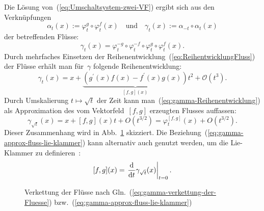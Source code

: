 Die Lösung von~$ $(\ref{eq:Umschaltsystem-zwei-VF}) ergibt sich
aus den Verknüpfungen 
\begin{equation}
\alpha_{t}(x):=\varphi_{t}^{g}\circ\varphi_{t}^{f}(x)\quad\mbox{und}\quad\gamma_{t}(x):=\alpha_{-t}\circ\alpha_{t}(x)\label{eq:alpha-gamma-verkettung}
\end{equation}
der betreffenden Flüsse: 
\begin{equation}
\gamma_{t}(x)=\varphi_{t}^{-g}\circ\varphi_{t}^{-f}\circ\varphi_{t}^{g}\circ\varphi_{t}^{f}(x).\label{eq:gamma-verkettung-der-Fluesse}
\end{equation}
Durch mehrfaches Einsetzen der Reihenentwicklung~(\ref{eq:ReihentwicklungFluss})
der Flüsse erhält man für~$\gamma$ folgende Reihenentwicklung:
\begin{equation}
\gamma_{t}(x)=x+\underbrace{\left(g^{\prime}(x)f(x)-f^{\prime}(x)g(x)\right)}_{{\displaystyle [f,g](x)}}t^{2}+\mathcal{O}(t^{3}).\label{eq:gamma-Reihenentwicklung}
\end{equation}
Durch Umskalierung $t\mapsto\sqrt{t}$ der Zeit kann man~(\ref{eq:gamma-Reihenentwicklung})
als Approximation des vom Vektor\-feld~$[f,g]$ erzeugten Flusses
auffassen: 
\begin{equation}
\gamma_{\sqrt{t}}(x)=x+[f,g](x)t+O(t^{3/2})=\varphi_{t}^{[f,g]}(x)+O(t^{3/2}).\label{eq:gamma-approx-fluss-lie-klammer}
\end{equation}
Dieser Zusammenhang wird in Abb.~\ref{fig:gamma-verkettete-fluesse}
skizziert. Die Beziehung~(\ref{eq:gamma-approx-fluss-lie-klammer})
kann alternativ auch genutzt werden, um die Lie-Klammer zu definieren~\cite[S.~35]{olver1993}:
\[
[f,g](x)=\left.\frac{{\mathrm{d}}}{{\mathrm{d}} t}\gamma_{\sqrt{t}}(x)\right|_{t=0}.
\]

\begin{figure}
\noindent \begin{centering}

\par\end{centering}
\caption{Verkettung der Flüsse nach Gln.~(\ref{eq:gamma-verkettung-der-Fluesse})
bzw.~(\ref{eq:gamma-approx-fluss-lie-klammer})\label{fig:gamma-verkettete-fluesse}}
\end{figure}

